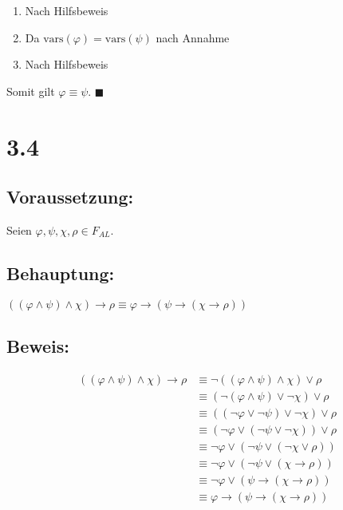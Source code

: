 \documentclass[12pt,a4paper]{scrartcl}
\begin{document}
\begin{enumerate} 
\item Nach Hilfsbeweis
\item Da $\text{vars}(\varphi) = \text{vars}(\psi)$ nach Annahme
\item Nach Hilfsbeweis
\end{enumerate} 

Somit gilt $\varphi \equiv \psi$. $\blacksquare$

\section*{3.4}
 
\subsection*{Voraussetzung:}

Seien $\varphi, \psi, \chi, \rho \in F_{AL}$.

\subsection*{Behauptung:}

$((\varphi \wedge \psi) \wedge \chi) \rightarrow \rho \equiv \varphi
\rightarrow (\psi \rightarrow (\chi \rightarrow \rho))$

\subsection*{Beweis:}
\setcounter{equation}{0}
\begin{align}
  ((\varphi \wedge \psi) \wedge \chi) \rightarrow \rho
  	& \equiv \neg((\varphi \wedge \psi) \wedge \chi) \vee \rho \\
  	& \equiv (\neg(\varphi \wedge \psi) \vee \neg\chi) \vee \rho \\
  	& \equiv ((\neg\varphi \vee \neg\psi) \vee \neg\chi) \vee \rho \\
  	& \equiv (\neg\varphi \vee (\neg\psi \vee \neg\chi)) \vee \rho \\
  	& \equiv \neg\varphi \vee (\neg\psi \vee (\neg\chi \vee \rho)) \\
  	& \equiv \neg\varphi \vee (\neg\psi \vee (\chi \rightarrow \rho)) \\
  	& \equiv \neg\varphi \vee (\psi \rightarrow (\chi \rightarrow \rho)) \\
  	& \equiv \varphi \rightarrow (\psi \rightarrow (\chi \rightarrow \rho))
\end{align}
\end{document}
